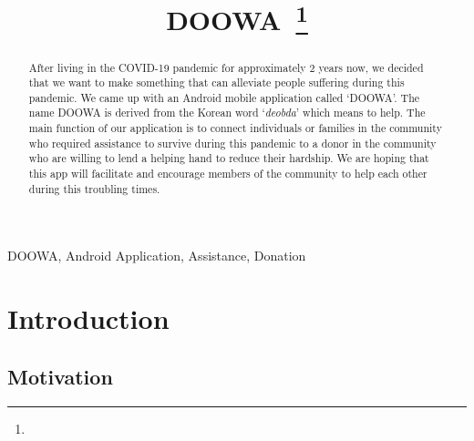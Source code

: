 \documentclass[conference]{IEEEtran}
\begin{document}
\title{DOOWA\
\thanks{}
}

\author{
\and
{}
\and
{}
}

\maketitle

\begin{abstract}
After living in the COVID-19 pandemic for approximately 2 years now, we decided that we want to make something that can alleviate people suffering during this pandemic. We came up with an Android mobile application called ‘DOOWA’. The name DOOWA is derived from the Korean word ‘\textit{deobda}’ which means to help. The main function of our application is to connect individuals or families in the community who required assistance to survive during this pandemic to a donor in the community who are willing to lend a helping hand to reduce their hardship. We are hoping that this app will facilitate and encourage members of the community to help each other during this troubling times.

\end{abstract}
\begin{IEEEkeywords}
DOOWA, Android Application, Assistance, Donation
\end{IEEEkeywords}

\section{Introduction}
\subsection{Motivation}
\end{document}
